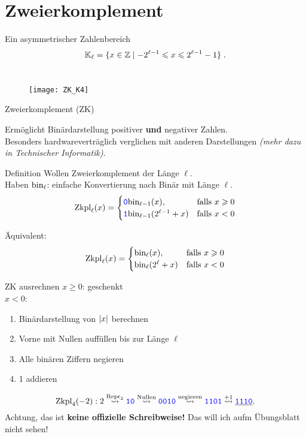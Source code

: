 \section{Zweierkomplement}

\begin{frame}{Ein asymmetrischer Zahlenbereich}
	\[
	\mathbb{K}_{\ell} = \{ x\in \mathbb{Z} \mid -2^{\ell-1} \leqslant x \leqslant 2^{\ell-1} -1 \} \;.
	\]
	\\[0.2cm]
	
	\begin{figure}
		\centering
		\texttt{[image: ZK\_K4]}
	\end{figure}
	
\end{frame}

\begin{frame}{Zweierkomplement (ZK)}
	
	Ermöglicht Binärdarstellung positiver \textbf{und} negativer Zahlen. \\
	Besonders hardwareverträglich verglichen mit anderen Darstellungen \textit{(mehr dazu in Technischer Informatik)}.

	\begin{block}{Definition}
		Wollen Zweierkomplement der Länge $\ell$. \\ Haben $\text{bin}_\ell$: einfache Konvertierung nach Binär mit Länge $\ell$.
		$$\text{Zkpl}_\ell(x) = \begin{cases} \hbox{\textcolor{blue}{\texttt{0}}} \text{bin}_{\ell-1}(x), & \text{falls } x \geqslant 0 \\ 
										 \hbox{\textcolor{blue}{\texttt{1}}} \text{bin}_{\ell-1}(2^{\ell-1}+x) & \text{falls } x < 0\end{cases}$$
		
		Äquivalent:
		$$\text{Zkpl}_\ell(x) = \begin{cases} \text{bin}_{\ell}(x), & \text{falls } x \geqslant 0 \\ 
										 \text{bin}_{\ell}(2^{\ell}+x) & \text{falls } x < 0\end{cases}$$
	\end{block}
\end{frame}

\begin{frame}{ZK ausrechnen}
	$x \geq 0$: geschenkt \smiley \\
	$x < 0$:
	\begin{enumerate}
		\item Binärdarstellung von $\left\lvert x \right\rvert$ berechnen
		\item Vorne mit Nullen auffüllen bis zur Länge $\ell$
		\item Alle binären Ziffern negieren
		\item 1 addieren
	\end{enumerate}
	
	\begin{Beispiel}
		 $$\fZkpl_4(-2): 2 \stackrel{\fRepr_2}{\?>} \word{10} \stackrel{\text{Nullen}}{\?>} \word{0010} \stackrel{\text{negieren}}{\?>} \word{1101} \stackrel{+1}{\?>} \underline{\word{1110}}. $$
		 Achtung, das ist \textbf{keine offizielle Schreibweise!} Das will ich aufm Übungsblatt nicht sehen!
	\end{Beispiel}
\end{frame}

